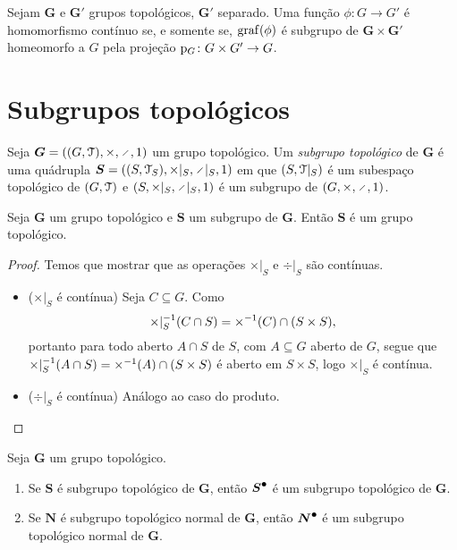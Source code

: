 \begin{proposition}
Sejam $\bm G$ e $\bm G'$ grupos topológicos, $\bm G'$ separado. Uma função $\phi\colon G \to G'$ é homomorfismo contínuo se, e somente se,
$\operatorname{graf}(\phi)$ é subgrupo de $\bm G \times \bm G'$ homeomorfo a $G$ pela projeção $\mathrm{p}_G\colon G \times G' \to G$.
\end{proposition}

\section{Subgrupos topológicos}

\begin{definition}
Seja $\bm G = ((G,\topo),\times,\div,\id)$ um grupo topológico. Um \emph{subgrupo topológico} de $\bm G$ é uma quádrupla $\bm S = ((S,\topo_S),\times|_S,\div|_S,\id)$ em que $(S,\mathcal{T}|_S)$ é um subespaço topológico de $(G,\mathcal{T})$ e $(S,\times|_S,\div|_S,\id)$ é um subgrupo de $(G,\times,\div,\id)$.
\end{definition}

\begin{proposition}
Seja $\bm G$ um grupo topológico e $\bm S$ um subgrupo de $\bm G$. Então $\bm S$ é um grupo topológico.
\end{proposition}
\begin{proof}
Temos que mostrar que as operações $\times|_S$ e $\div|_S$ são contínuas.
	\begin{itemize}
	\item ($\times|_S$ é contínua)
		Seja $C \subseteq G$. Como
		\begin{equation*}
		\times|_S ^{-1} (C \cap S) = \times ^{-1} (C) \cap (S \times S),
		\end{equation*}
		portanto para todo aberto $A \cap S$ de $S$, com $A \subseteq G$ aberto de $G$, segue que $\times|_S ^{-1} (A \cap S) = \times ^{-1} (A) \cap (S \times S)$ é aberto em $S \times S$, logo $\times|_S$ é contínua.
	\item ($\div|_S$ é contínua)
		Análogo ao caso do produto. \qedhere
	\end{itemize}
\end{proof}

\begin{proposition}
Seja $\bm G$ um grupo topológico.
	\begin{enumerate}
	\item Se $\bm S$ é subgrupo topológico de $\bm G$, então $\bm{{S}^\bullet}$ é um subgrupo topológico de $\bm G$.
	\item Se $\bm N$ é subgrupo topológico normal de $\bm G$, então $\bm{{N}^\bullet}$ é um subgrupo topológico normal de $\bm G$.
	\end{enumerate}
\end{proposition}

